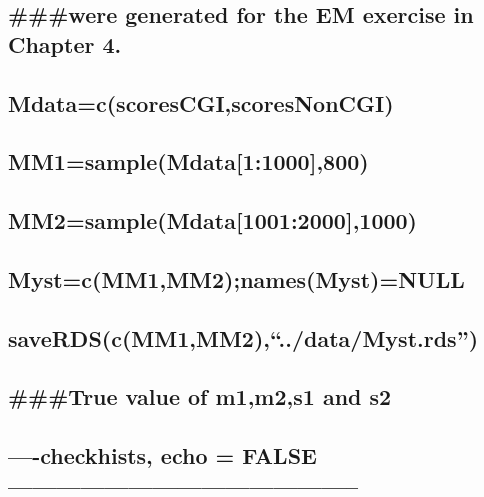 \documentclass[]{article}
\begin{document}
\subsection{\#\#\#were generated for the EM exercise in Chapter
4.}\label{were-generated-for-the-em-exercise-in-chapter-4.}

\subsection{Mdata=c(scoresCGI,scoresNonCGI)}\label{mdatacscorescgiscoresnoncgi}

\subsection{MM1=sample(Mdata{[}1:1000{]},800)}\label{mm1samplemdata11000800}

\subsection{MM2=sample(Mdata{[}1001:2000{]},1000)}\label{mm2samplemdata100120001000}

\subsection{Myst=c(MM1,MM2);names(Myst)=NULL}\label{mystcmm1mm2namesmystnull}

\subsection{\texorpdfstring{saveRDS(c(MM1,MM2),``../data/Myst.rds'')}{saveRDS(c(MM1,MM2),../data/Myst.rds)}}\label{saverdscmm1mm2..datamyst.rds}

\subsection{\#\#\#True value of m1,m2,s1 and
s2}\label{true-value-of-m1m2s1-and-s2}

\subsection{}\label{section}

\subsection{----checkhists, echo =
FALSE--------------------------------------------}\label{checkhists-echo-false}
\end{document}
